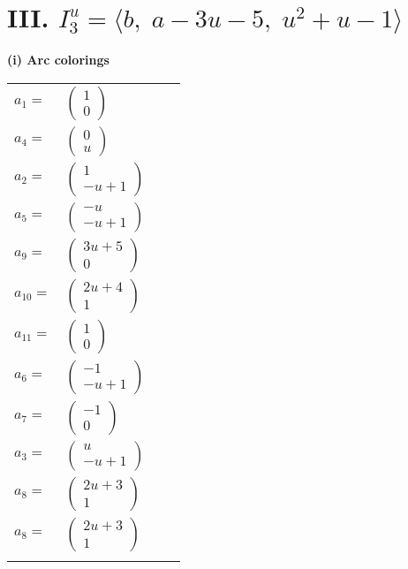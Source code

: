 \documentclass[1p]{elsarticle_modified}
\theoremstyle{definition}
\begin{document}
\centering \section*{III. $I^u_{3}= \langle b,\;a-3 u-5,\;u^2+u-1 \rangle$}
\flushleft \textbf{(i) Arc colorings}\\
\begin{tabular}{m{7pt} m{180pt} m{7pt} m{180pt} }
\flushright $a_{1}=$&$\begin{pmatrix}1\\0\end{pmatrix}$ \\
\flushright $a_{4}=$&$\begin{pmatrix}0\\u\end{pmatrix}$ \\
\flushright $a_{2}=$&$\begin{pmatrix}1\\- u+1\end{pmatrix}$ \\
\flushright $a_{5}=$&$\begin{pmatrix}- u\\- u+1\end{pmatrix}$ \\
\flushright $a_{9}=$&$\begin{pmatrix}3 u+5\\0\end{pmatrix}$ \\
\flushright $a_{10}=$&$\begin{pmatrix}2 u+4\\1\end{pmatrix}$ \\
\flushright $a_{11}=$&$\begin{pmatrix}1\\0\end{pmatrix}$ \\
\flushright $a_{6}=$&$\begin{pmatrix}-1\\- u+1\end{pmatrix}$ \\
\flushright $a_{7}=$&$\begin{pmatrix}-1\\0\end{pmatrix}$ \\
\flushright $a_{3}=$&$\begin{pmatrix}u\\- u+1\end{pmatrix}$ \\
\flushright $a_{8}=$&$\begin{pmatrix}2 u+3\\1\end{pmatrix}$\\ \flushright $a_{8}=$&$\begin{pmatrix}2 u+3\\1\end{pmatrix}$\\&\end{tabular}
\end{document}
